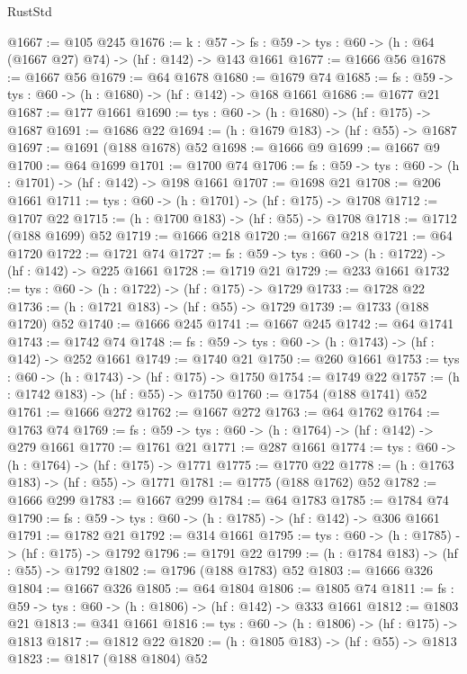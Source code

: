 \begin{lexlean}{RustStd}
\begin{coremodule}
@1667 := @105 @245
@1676 := {k : @57} ->
  {fs : @59} -> {tys : @60} -> (h : @64 (@1667 @27) @74) -> (hf : @142) -> @143 @1661
@1677 := @1666 @56
@1678 := @1667 @56
@1679 := @64 @1678
@1680 := @1679 @74
@1685 := {fs : @59} -> {tys : @60} -> (h : @1680) -> (hf : @142) -> @168 @1661
@1686 := @1677 @21
@1687 := @177 @1661
@1690 := {tys : @60} -> (h : @1680) -> (hf : @175) -> @1687
@1691 := @1686 @22
@1694 := (h : @1679 @183) -> (hf : @55) -> @1687
@1697 := @1691 (@188 @1678) @52
@1698 := @1666 @9
@1699 := @1667 @9
@1700 := @64 @1699
@1701 := @1700 @74
@1706 := {fs : @59} -> {tys : @60} -> (h : @1701) -> (hf : @142) -> @198 @1661
@1707 := @1698 @21
@1708 := @206 @1661
@1711 := {tys : @60} -> (h : @1701) -> (hf : @175) -> @1708
@1712 := @1707 @22
@1715 := (h : @1700 @183) -> (hf : @55) -> @1708
@1718 := @1712 (@188 @1699) @52
@1719 := @1666 @218
@1720 := @1667 @218
@1721 := @64 @1720
@1722 := @1721 @74
@1727 := {fs : @59} -> {tys : @60} -> (h : @1722) -> (hf : @142) -> @225 @1661
@1728 := @1719 @21
@1729 := @233 @1661
@1732 := {tys : @60} -> (h : @1722) -> (hf : @175) -> @1729
@1733 := @1728 @22
@1736 := (h : @1721 @183) -> (hf : @55) -> @1729
@1739 := @1733 (@188 @1720) @52
@1740 := @1666 @245
@1741 := @1667 @245
@1742 := @64 @1741
@1743 := @1742 @74
@1748 := {fs : @59} -> {tys : @60} -> (h : @1743) -> (hf : @142) -> @252 @1661
@1749 := @1740 @21
@1750 := @260 @1661
@1753 := {tys : @60} -> (h : @1743) -> (hf : @175) -> @1750
@1754 := @1749 @22
@1757 := (h : @1742 @183) -> (hf : @55) -> @1750
@1760 := @1754 (@188 @1741) @52
@1761 := @1666 @272
@1762 := @1667 @272
@1763 := @64 @1762
@1764 := @1763 @74
@1769 := {fs : @59} -> {tys : @60} -> (h : @1764) -> (hf : @142) -> @279 @1661
@1770 := @1761 @21
@1771 := @287 @1661
@1774 := {tys : @60} -> (h : @1764) -> (hf : @175) -> @1771
@1775 := @1770 @22
@1778 := (h : @1763 @183) -> (hf : @55) -> @1771
@1781 := @1775 (@188 @1762) @52
@1782 := @1666 @299
@1783 := @1667 @299
@1784 := @64 @1783
@1785 := @1784 @74
@1790 := {fs : @59} -> {tys : @60} -> (h : @1785) -> (hf : @142) -> @306 @1661
@1791 := @1782 @21
@1792 := @314 @1661
@1795 := {tys : @60} -> (h : @1785) -> (hf : @175) -> @1792
@1796 := @1791 @22
@1799 := (h : @1784 @183) -> (hf : @55) -> @1792
@1802 := @1796 (@188 @1783) @52
@1803 := @1666 @326
@1804 := @1667 @326
@1805 := @64 @1804
@1806 := @1805 @74
@1811 := {fs : @59} -> {tys : @60} -> (h : @1806) -> (hf : @142) -> @333 @1661
@1812 := @1803 @21
@1813 := @341 @1661
@1816 := {tys : @60} -> (h : @1806) -> (hf : @175) -> @1813
@1817 := @1812 @22
@1820 := (h : @1805 @183) -> (hf : @55) -> @1813
@1823 := @1817 (@188 @1804) @52

\end{coremodule}
\end{lexlean}
